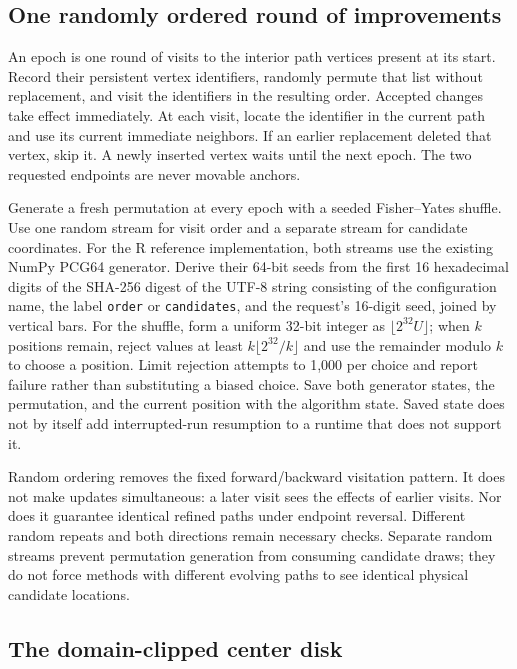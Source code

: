 \documentclass[11pt,letterpaper]{article}
\newcommand{\src}[1]{\nolinkurl{#1}}
\begin{document}
\subsection{One randomly ordered round of improvements}

An epoch is one round of visits to the interior path vertices present at its
start. Record their persistent vertex identifiers, randomly permute that list
without replacement, and visit the identifiers in the resulting order.
Accepted changes take effect immediately. At each visit, locate the identifier
in the current path and use its current immediate neighbors. If an earlier
replacement deleted that vertex, skip it. A newly inserted vertex waits until
the next epoch. The two requested endpoints are never movable anchors.

Generate a fresh permutation at every epoch with a seeded Fisher--Yates
shuffle. Use one random stream for visit order and a separate stream for
candidate coordinates. For the R reference implementation, both streams use
the existing NumPy PCG64 generator. Derive their 64-bit seeds from the first
16 hexadecimal digits of the SHA-256 digest of the UTF-8 string consisting of
the configuration name, the label \src{order} or \src{candidates}, and the
request's 16-digit seed, joined by vertical bars. For the shuffle, form a
uniform 32-bit integer as $\lfloor2^{32}U\rfloor$; when $k$ positions remain,
reject values at least $k\lfloor2^{32}/k\rfloor$ and use the remainder modulo
$k$ to choose a position. Limit rejection attempts to 1,000 per choice and
report failure rather than substituting a biased choice. Save both generator
states, the permutation, and the current position with the algorithm state.
Saved state does not by itself add interrupted-run resumption to a runtime
that does not support it.

Random ordering removes the fixed forward/backward visitation pattern. It does
not make updates simultaneous: a later visit sees the effects of earlier
visits. Nor does it guarantee identical refined paths under endpoint reversal.
Different random repeats and both directions remain necessary checks. Separate
random streams prevent permutation generation from consuming candidate draws;
they do not force methods with different evolving paths to see identical
physical candidate locations.

\subsection{The domain-clipped center disk}
\end{document}
